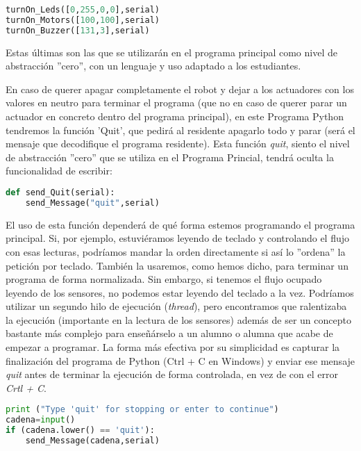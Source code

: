 \begin{lstlisting}[language=python,caption={Uso de los actuadores desde el Programa Principal}]
turnOn_Leds([0,255,0,0],serial)
turnOn_Motors([100,100],serial)
turnOn_Buzzer([131,3],serial)
\end{lstlisting}

Estas últimas son las que se utilizarán en el programa principal como nivel de abstracción ''cero'', con un lenguaje y uso adaptado a los estudiantes.\\

\par En caso de querer apagar completamente el robot y dejar a los actuadores con los valores en neutro para terminar el programa (que no en caso de querer parar un actuador en concreto dentro del programa principal), en este Programa Python tendremos la función 'Quit', que pedirá al residente apagarlo todo y parar (será el mensaje que decodifique el programa residente). Esta función \textit{quit}, siento el nivel de abstracción ''cero'' que se utiliza en el Programa Princial, tendrá oculta la funcionalidad de escribir:

\begin{lstlisting}[language=python,caption={Mensaje \textit{terminate} para los actuadores}]
def send_Quit(serial):
	send_Message("quit",serial)
\end{lstlisting}

El uso de esta función dependerá de qué forma estemos programando el programa principal. Si, por ejemplo, estuviéramos leyendo de teclado y controlando el flujo con esas lecturas, podríamos mandar la orden directamente si así lo ''ordena'' la petición por teclado. También la usaremos, como hemos dicho, para terminar un programa de forma normalizada. Sin embargo, si tenemos el flujo ocupado leyendo de los sensores, no podemos estar leyendo del teclado a la vez. Podríamos utilizar un segundo hilo de ejecución (\textit{thread}), pero encontramos que ralentizaba la ejecución (importante en la lectura de los sensores) además de ser un concepto bastante más complejo para enseñárselo a un alumno o alumna que acabe de empezar a programar. La forma más efectiva por su simplicidad es capturar la finalización del programa de Python (Ctrl + C en Windows) y enviar ese mensaje \textit{quit} antes de terminar la ejecución de forma controlada, en vez de con el error \textit{Crtl + C}. \\

\begin{lstlisting}[language=python,caption={Ejemplo de finalización de programa con control de flujo}]
print ("Type 'quit' for stopping or enter to continue")
cadena=input()
if (cadena.lower() == 'quit'):
	send_Message(cadena,serial)
	
\end{lstlisting}

